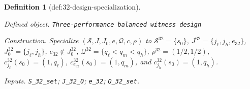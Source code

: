 \documentclass{article}
\newtheorem{definition}{Definition}
\begin{document}
\begin{definition}[def:32-design-specialization]\label{def:32-design-specialization}
\par\smallskip\noindent\emph{Defined object.} \texttt{Three-\allowbreak{}performance balanced witness design}
\par\smallskip\noindent\emph{Construction.} Specialize \((\mathcal S,J,J_0,e,\mathcal Q,c,\rho)\) to \(\mathcal S^{32}=\{s_0\}\), \(J^{32}=\{j_{\ell},j_h,e_{32}\}\), \(J^{32}_0=\{j_{\ell},j_h\}\), \(e_{32}\notin J^{32}_0\), \(\mathcal Q^{32}=\{q_{\ell}<q_m<q_h\}\), \(\rho^{32}=(1/2,1/2)\), \(c^{32}_{j_{\ell}}(s_0)=(1,q_{\ell})\), \(c^{32}_{e_{32}}(s_0)=(1,q_m)\), and \(c^{32}_{j_h}(s_0)=(1,q_h)\).
\par\smallskip\noindent\emph{Inputs.} \texttt{S\_\allowbreak{}32\_\allowbreak{}set}; \texttt{J\_\allowbreak{}32\_\allowbreak{}0}; \texttt{e\_\allowbreak{}32}; \texttt{Q\_\allowbreak{}32\_\allowbreak{}set}.
\end{definition}
\end{document}
